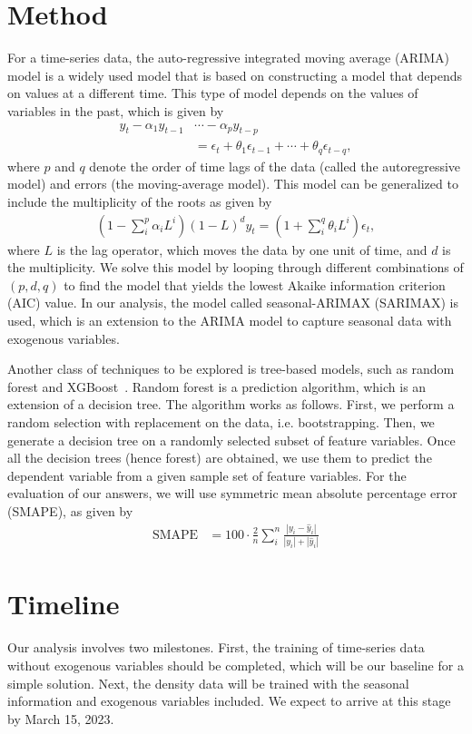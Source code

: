 \documentclass[prl,aps,superscriptaddress,twocolumn,10pt,nolongbibliography]{revtex4-2}
\begin{document}
\section{Method}
For a time-series data, the auto-regressive integrated moving average (ARIMA) model is a widely used model that is based on constructing a model that depends on values at a different time. 
This type of model depends on the values of variables in the past, which is given by 
\begin{align}
y_t - \alpha_1 y_{t-1} &\cdots - \alpha_p y_{t-p} \nonumber \\
&= \epsilon_t + \theta_1 \epsilon_{t-1} + \cdots + \theta_q \epsilon_{t-q},
\end{align}
where $p$ and $q$ denote the order of time lags of the data (called the autoregressive model) and errors (the moving-average model). 
This model can be generalized to include the multiplicity of the roots as given by 
\begin{align}
(1 - \sum_i^p \alpha_i L^i) (1 - L)^d y_t = (1 + \sum_i^q \theta_i L^i) \epsilon_t,
\end{align}
where $L$ is the lag operator, which moves the data by one unit of time, and $d$ is the multiplicity. 
We solve this model by looping through different combinations of $(p, d, q)$ to find the model that yields the lowest Akaike information criterion (AIC) value. 
In our analysis, the model called seasonal-ARIMAX (SARIMAX) is used, which is an extension to the ARIMA model to capture seasonal data with exogenous variables.

Another class of techniques to be explored is tree-based models, such as random forest and XGBoost~\cite{chen2016xgboost}.
Random forest is a prediction algorithm, which is an extension of a decision tree. 
The algorithm works as follows. First, we perform a random selection with replacement on the data, i.e. bootstrapping. 
Then, we generate a decision tree on a randomly selected subset of feature variables. 
Once all the decision trees (hence forest) are obtained, we use them to predict the dependent variable from a given sample set of feature variables.
For the evaluation of our answers, we will use symmetric mean absolute percentage error (SMAPE), as given by
\begin{align}
\textrm{SMAPE} &= 100 \cdot \frac{2}{n} \sum_{i}^n \frac{|y_i - \hat{y}_i|}{|y_i| + |\hat{y}_i|}
\end{align}

\section{Timeline}
Our analysis involves two milestones. 
First, the training of time-series data without exogenous variables should be completed, which will be our baseline for a simple solution. 
Next, the density data will be trained with the seasonal information and exogenous variables included. 
We expect to arrive at this stage by March 15, 2023.
\end{document}
